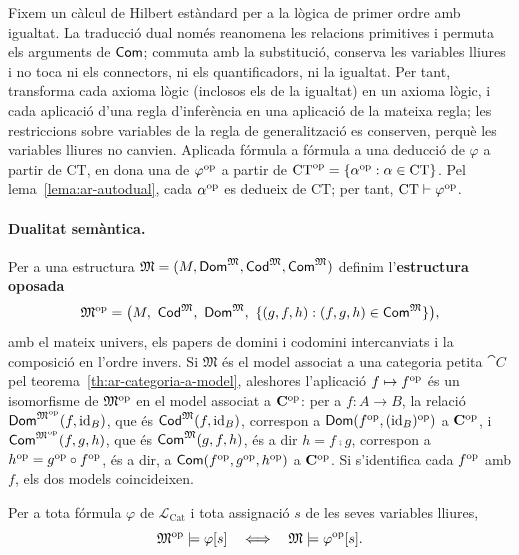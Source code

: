 \begin{prova}
Fixem un càlcul de Hilbert estàndard per a la lògica de primer ordre amb igualtat. La traducció dual només reanomena les relacions primitives i permuta els arguments de $\mathsf{Com}$; commuta amb la substitució, conserva les variables lliures i no toca ni els connectors, ni els quantificadors, ni la igualtat. Per tant, transforma cada axioma lògic (inclosos els de la igualtat) en un axioma lògic, i cada aplicació d'una regla d'inferència en una aplicació de la mateixa regla; les restriccions sobre variables de la regla de generalització es conserven, perquè les variables lliures no canvien. Aplicada fórmula a fórmula a una deducció de $\varphi$ a partir de $\mathrm{CT}$, en dona una de $\varphi^{\mathrm{op}}$ a partir de $\mathrm{CT}^{\mathrm{op}}=\{\alpha^{\mathrm{op}}:\alpha\in\mathrm{CT}\}$. Pel lema~\ref{lema:ar-autodual}, cada $\alpha^{\mathrm{op}}$ es dedueix de $\mathrm{CT}$; per tant, $\mathrm{CT}\vdash\varphi^{\mathrm{op}}$.
\end{prova}

\paragraph{Dualitat semàntica.}
Per a una estructura $\mathfrak M=(M,\mathsf{Dom}^{\mathfrak M},\mathsf{Cod}^{\mathfrak M},\mathsf{Com}^{\mathfrak M})$ definim l'\textbf{estructura oposada}
\[
\mathfrak M\op=\bigl(M,\ \Cod^{\mathfrak M},\ \Dom^{\mathfrak M},\ \{(g,f,h):(f,g,h)\in\Com^{\mathfrak M}\}\bigr),
\]
amb el mateix univers, els papers de domini i codomini intercanviats i la composició en l'ordre invers. Si $\mathfrak M$ és el model associat a una categoria petita $\cat{C}$ pel teorema~\ref{th:ar-categoria-a-model}, aleshores l'aplicació $f\mapsto f^{\mathrm{op}}$ és un isomorfisme de $\mathfrak M^{\mathrm{op}}$ en el model associat a $\mathbf{C}^{\mathrm{op}}$: per a $f\colon A\to B$, la relació $\mathsf{Dom}^{\mathfrak M^{\mathrm{op}}}(f,\operatorname{id}_B)$, que és $\mathsf{Cod}^{\mathfrak M}(f,\operatorname{id}_B)$, correspon a $\mathsf{Dom}(f^{\mathrm{op}},(\operatorname{id}_B)^{\mathrm{op}})$ a $\mathbf{C}^{\mathrm{op}}$, i $\mathsf{Com}^{\mathfrak M^{\mathrm{op}}}(f,g,h)$, que és $\mathsf{Com}^{\mathfrak M}(g,f,h)$, és a dir $h=f\comp g$, correspon a $h^{\mathrm{op}}=g^{\mathrm{op}}\circ f^{\mathrm{op}}$, és a dir, a $\mathsf{Com}(f^{\mathrm{op}},g^{\mathrm{op}},h^{\mathrm{op}})$ a $\mathbf{C}^{\mathrm{op}}$. Si s'identifica cada $f^{\mathrm{op}}$ amb $f$, els dos models coincideixen.

\begin{lema}\label{lema:ar-oposada}
Per a tota fórmula $\varphi$ de $\mathcal L_{\mathrm{Cat}}$ i tota assignació $s$ de les seves variables lliures,
\[
\mathfrak M^{\mathrm{op}}\models\varphi[s]
\quad\Longleftrightarrow\quad
\mathfrak M\models\varphi^{\mathrm{op}}[s].
\]
\end{lema}

